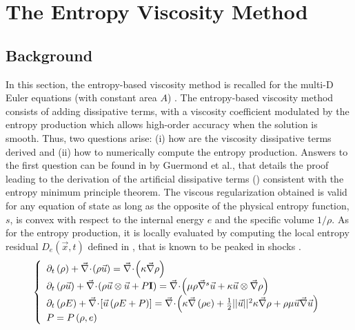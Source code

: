 \section{The Entropy Viscosity Method} \label{sec:entro_visc}
\subsection{Background} \label{sec:background}
In this section, the entropy-based viscosity method \cite{jlg1, jlg2, jlg3} is recalled for the multi-D Euler equations (with constant area $A$) \cite{valentin}. The entropy-based viscosity method consists of adding dissipative terms, with a viscosity coefficient modulated by the entropy production which allows high-order accuracy when the solution is smooth. Thus, two questions arise: (i) how are the viscosity dissipative terms derived and (ii) how to numerically compute the entropy production. Answers to the first question can be found in \cite{jlg} by Guermond et al., that details the proof leading to the derivation of the artificial dissipative terms () consistent with the entropy minimum principle theorem. The viscous regularization obtained is valid for any equation of state as long as the opposite of the physical entropy function, $s$, is convex with respect to the internal energy $e$ and the specific volume $1/\rho$. As for the entropy production, it is locally evaluated by computing the local entropy residual $D_e(\vec{x},t)$ defined in , that is known to be peaked in shocks \cite{Toro}.
\begin{equation}
\label{eq:euler_visc}
\left\{ 
\begin{array}{lll}
\partial_t \left( \rho \right) + \div \left( \rho \vec{u} \right) = \div \left( \kappa \grad \rho \right) \\
\partial_t \left( \rho \vec{u} \right) + \div \left( \rho \vec{u} \otimes \vec{u} + P \mathbf{I} \right) = \div \left( \mu \rho \grad^s \vec{u}  + \kappa \vec{u} \otimes \grad \rho \right)  \\
\partial_t \left( \rho E \right) + \div \left[ \vec{u} \left( \rho E + P \right) \right] = \div \left( \kappa \grad \left( \rho e \right) + \frac{1}{2}|| \vec{u} ||^2 \kappa \grad \rho +  \rho \mu \vec{u} \grad \vec{u}  \right) \\
P = P\left( \rho, e \right)
\end{array}
\right.
\end{equation}
